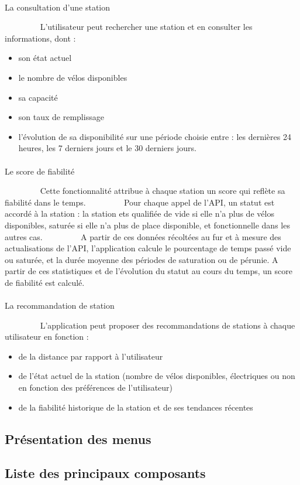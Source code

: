 \documentclass[
  french,
  11pt,
  a4paper,
]{article}
\makeatletter
\let\oldparagraph\paragraph
\renewcommand{\paragraph}{
    \@ifstar
      \xxxParagraphStar
      \xxxParagraphNoStar
  }
\newcommand{\xxxParagraphStar}[1]{\oldparagraph*{#1}\mbox{}}
\newcommand{\xxxParagraphNoStar}[1]{\oldparagraph{#1}\mbox{}}
\providecommand{\tightlist}{%
  \setlength{\itemsep}{0pt}\setlength{\parskip}{0pt}}
\makeatother
\begin{document}
\paragraph{La consultation d'une
station}\label{la-consultation-dune-station}

~~~~~~~~ L'utilisateur peut rechercher une station et en consulter les
informations, dont :

\begin{itemize}
\tightlist
\item
  son état actuel
\item
  le nombre de vélos disponibles
\item
  sa capacité
\item
  son taux de remplissage
\item
  l'évolution de sa disponibilité sur une période choisie entre : les
  dernières 24 heures, les 7 derniers jours et le 30 derniers jours.
\end{itemize}

\paragraph{Le score de fiabilité}\label{le-score-de-fiabilituxe9}

~~~~~~~~ Cette fonctionnalité attribue à chaque station un score qui
reflète sa fiabilité dans le temps. ~~~~~~~~ Pour chaque appel de l'API,
un statut est accordé à la station : la station ets qualifiée de vide si
elle n'a plus de vélos disponibles, saturée si elle n'a plus de place
disponible, et fonctionnelle dans les autres cas. ~~~~~~~~ A partir de
ces données récoltées au fur et à mesure des actualisations de l'API,
l'application calcule le pourcentage de temps passé vide ou saturée, et
la durée moyenne des périodes de saturation ou de pérunie. A partir de
ces statistiques et de l'évolution du statut au cours du temps, un score
de fiabilité est calculé.

\paragraph{La recommandation de
station}\label{la-recommandation-de-station}

~~~~~~~~ L'application peut proposer des recommandations de stations à
chaque utilisateur en fonction :

\begin{itemize}
\tightlist
\item
  de la distance par rapport à l'utilisateur
\item
  de l'état actuel de la station (nombre de vélos disponibles,
  électriques ou non en fonction des préférences de l'utilisateur)
\item
  de la fiabilité historique de la station et de ses tendances récentes
\end{itemize}

\subsection{Présentation des menus}\label{pruxe9sentation-des-menus}

\subsection{Liste des principaux
composants}\label{liste-des-principaux-composants}
\end{document}
